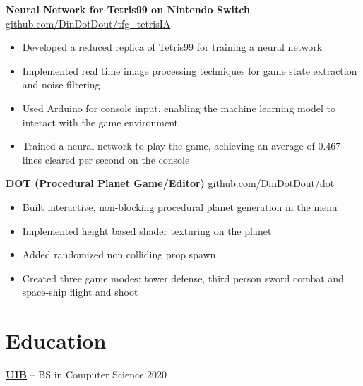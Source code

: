 \documentclass[10pt]{article}       %
\begin{document}
\textbf{Neural Network for Tetris99 on Nintendo Switch} \hfill \href{https://github.com/DinDotDout/tfg_tetrisIA }{github.com/DinDotDout/tfg\_tetrisIA} \\
\vspace{-9pt}
\begin{itemize}
	\item Developed a reduced replica of Tetris99 for training a neural network
	\item Implemented real time image processing techniques for game state extraction and noise filtering
	\item Used Arduino for console input, enabling the machine learning model to interact with the game environment
	\item Trained a neural network to play the game, achieving an average of 0.467 lines cleared per second on the console
\end{itemize}

\textbf{DOT (Procedural Planet Game/Editor)} \hfill \href{https://github.com/DinDotDout/dot}{github.com/DinDotDout/dot} \\
\vspace{-9pt}
\begin{itemize}
	\item Built interactive, non-blocking procedural planet generation in the menu
	\item Implemented height based shader texturing on the planet
	\item Added randomized non colliding prop spawn
	\item Created three game modes: tower defense, third person sword combat and space-ship flight and shoot
\end{itemize}

\vspace{-18.5pt}

\section*{Education}
\textbf{\href{https://www.uib.eu/}{UIB}} -- BS in Computer Science \hfill 2020 \\
\end{document}
